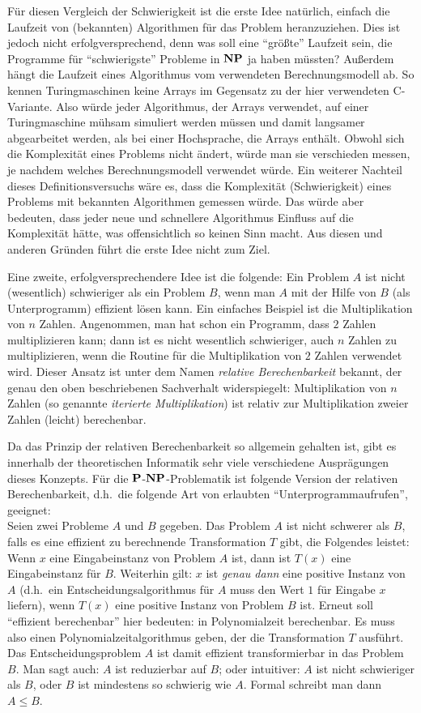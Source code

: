 Für diesen Vergleich der Schwierigkeit ist die erste Idee natürlich,
einfach die Laufzeit von (bekannten) Algorithmen für das Problem
heranzuziehen. Dies ist jedoch nicht erfolgversprechend, denn was soll
eine "`größte"' Laufzeit sein, die Programme für "`schwierigste"'
Probleme in $\NP$ ja haben müssten?  Außerdem hängt die Laufzeit eines
Algorithmus vom verwendeten Berechnungsmodell ab. So kennen
Turingmaschinen keine Arrays im Gegensatz zu der hier verwendeten
C-Variante. Also würde jeder Algorithmus, der Arrays verwendet,
auf einer Turingmaschine mühsam simuliert werden müssen und damit
langsamer abgearbeitet werden, als bei einer Hochsprache, die Arrays
enthält. Obwohl sich die Komplexität eines Problems nicht ändert,
würde man sie verschieden messen, je nachdem welches Berechnungsmodell
verwendet würde. Ein weiterer Nachteil dieses Definitionsversuchs wäre
es, dass die Komplexität (Schwierigkeit) eines Problems mit bekannten
Algorithmen gemessen würde. Das würde aber bedeuten, dass jeder neue
und schnellere Algorithmus Einfluss auf die Komplexität hätte, was
offensichtlich so keinen Sinn macht.  Aus diesen und anderen Gründen
führt die erste Idee nicht zum Ziel.

Eine zweite, erfolgversprechendere Idee ist die folgende: Ein Problem
$A$ ist nicht (wesentlich) schwieriger als ein Problem $B$, wenn man
$A$ mit der Hilfe von $B$ (als Unterprogramm) effizient lösen
kann. Ein einfaches Beispiel ist die Multiplikation von $n$ Zahlen.
Angenommen, man hat schon ein Programm, dass $2$ Zahlen multiplizieren
kann; dann ist es nicht wesentlich schwieriger, auch $n$ Zahlen zu
multiplizieren, wenn die Routine für die Multiplikation von $2$ Zahlen
verwendet wird. Dieser Ansatz ist unter dem Namen \emph{relative
  Berechenbarkeit} bekannt, der genau den oben beschriebenen
Sachverhalt widerspiegelt: Multiplikation von $n$ Zahlen (so genannte
\emph{iterierte Multiplikation}) ist relativ zur Multiplikation zweier
Zahlen (leicht) berechenbar.

Da das Prinzip der relativen Berechenbarkeit so allgemein gehalten
ist, gibt es innerhalb der theoretischen Informatik sehr viele
verschiedene Ausprägungen dieses Konzepts. Für die
$\P$-$\NP$-Problematik ist folgende Version der relativen
Berechenbarkeit, d.h.~die folgende Art von erlaubten
"`Unterprogrammaufrufen"', geeignet:\\
%
Seien zwei Probleme $A$ und $B$ gegeben. Das Problem $A$ ist nicht
schwerer als $B$, falls es eine effizient zu berechnende
Transformation $T$ gibt, die Folgendes leistet: Wenn $x$ eine
Eingabeinstanz von Problem $A$ ist, dann ist $T(x)$ eine
Eingabeinstanz für $B$. Weiterhin gilt: $x$ ist \emph{genau dann} eine
positive Instanz von $A$ (d.h.~ein Entscheidungsalgorithmus für $A$
muss den Wert $1$ für Eingabe $x$ liefern), wenn $T(x)$ eine positive
Instanz von Problem $B$ ist. Erneut soll "`effizient berechenbar"'
hier bedeuten: in Polynomialzeit berechenbar. Es muss also einen
Polynomialzeitalgorithmus geben, der die Transformation $T$ ausführt.
Das Entscheidungsproblem $A$ ist damit effizient transformierbar in
das Problem $B$. Man sagt auch: $A$ ist reduzierbar auf $B$; oder
intuitiver: $A$ ist nicht schwieriger als $B$, oder $B$ ist mindestens
so schwierig wie $A$. Formal schreibt man dann $A\leq B$.

